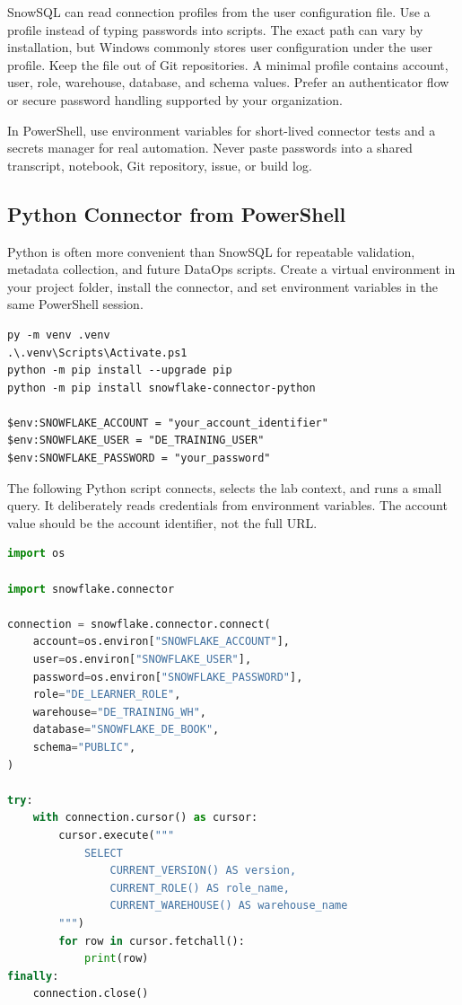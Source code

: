 SnowSQL can read connection profiles from the user configuration file. Use a profile instead of typing passwords into scripts. The exact path can vary by installation, but Windows commonly stores user configuration under the user profile. Keep the file out of Git repositories. A minimal profile contains account, user, role, warehouse, database, and schema values. Prefer an authenticator flow or secure password handling supported by your organization.

\begin{tipbox}
In PowerShell, use environment variables for short-lived connector tests and a secrets manager for real automation. Never paste passwords into a shared transcript, notebook, Git repository, issue, or build log.
\end{tipbox}

\subsection{Python Connector from PowerShell}
Python is often more convenient than SnowSQL for repeatable validation, metadata collection, and future DataOps scripts. Create a virtual environment in your project folder, install the connector, and set environment variables in the same PowerShell session.

\begin{lstlisting}[language={},caption={Installing the Python connector in Windows PowerShell.},label={lst:chapter0-python-install}]
py -m venv .venv
.\.venv\Scripts\Activate.ps1
python -m pip install --upgrade pip
python -m pip install snowflake-connector-python

$env:SNOWFLAKE_ACCOUNT = "your_account_identifier"
$env:SNOWFLAKE_USER = "DE_TRAINING_USER"
$env:SNOWFLAKE_PASSWORD = "your_password"
\end{lstlisting}

The following Python script connects, selects the lab context, and runs a small query. It deliberately reads credentials from environment variables. The account value should be the account identifier, not the full URL.

\begin{lstlisting}[language=Python,caption={Connecting to Snowflake with the Python connector and running a query.},label={lst:chapter0-python-query}]
import os

import snowflake.connector

connection = snowflake.connector.connect(
    account=os.environ["SNOWFLAKE_ACCOUNT"],
    user=os.environ["SNOWFLAKE_USER"],
    password=os.environ["SNOWFLAKE_PASSWORD"],
    role="DE_LEARNER_ROLE",
    warehouse="DE_TRAINING_WH",
    database="SNOWFLAKE_DE_BOOK",
    schema="PUBLIC",
)

try:
    with connection.cursor() as cursor:
        cursor.execute("""
            SELECT
                CURRENT_VERSION() AS version,
                CURRENT_ROLE() AS role_name,
                CURRENT_WAREHOUSE() AS warehouse_name
        """)
        for row in cursor.fetchall():
            print(row)
finally:
    connection.close()
\end{lstlisting}

